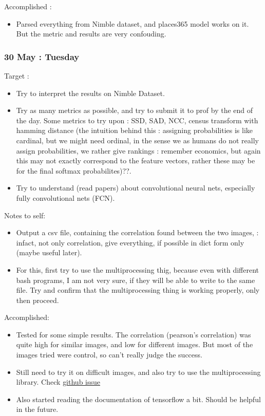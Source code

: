 \documentclass{article}
\begin{document}
Accomplished :
\begin{itemize}
\item Parsed everything from Nimble dataset, and places365 model works on it. But the metric and results are very confouding.
\end{itemize}

\subsubsection{30 May : Tuesday}
Target :
\begin{itemize}
\item Try to interpret the results on Nimble Dataset.
\item Try as many metrics as possible, and try to submit it to prof by the end of the day. Some metrics to try upon : SSD, SAD, NCC, census transform with hamming distance (the intuition behind this : assigning probabilities is like cardinal, but we might need ordinal, in the sense we as humans do not really assign probabilities, we rather give rankings : remember economics, but again this may not exactly correspond to the feature vectors, rather these may be for the final softmax probabilites)??.
\item Try to understand (read papers) about convolutional neural nets, especially fully convolutional nets (FCN).
\end{itemize}

Notes to self:
\begin{itemize}
\item Output a csv file, containing the correlation found between the two images, : infact, not only correlation, give everything, if possible in dict form only (maybe useful later).
\item For this, first try to use the multiprocessing thig, because even with different bash programs, I am not very sure, if they will be able to write to the same file. Try and confirm that the multiprocessing thing is working properly, only then proceed.
\end{itemize}

Accomplished:
\begin{itemize}
\item Tested for some simple results. The correlation (pearson's correlation) was quite high for similar images, and low for different images. But most of the images tried were control, so can't really judge the success.
\item Still need to try it on difficult images, and also try to use the multiprocessing library. Check \href{https://github.com/BVLC/caffe/issues/3607#issuecomment-305180367}{github issue}
\item Also started reading the documentation of tensorflow a bit. Should be helpful in the future. 
\end{itemize}
\end{document}
